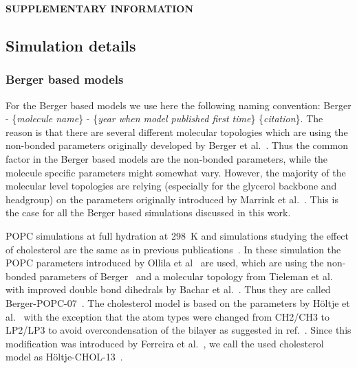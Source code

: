 \documentclass[journal=jacsat,manuscript=article]{achemso}
\begin{document}


\newpage
\begin{center}
{\bf SUPPLEMENTARY INFORMATION}
\end{center}
\subsection{Simulation details} 
\subsubsection{Berger based models}
For the Berger based models we use here the following naming convention: 
Berger - \{{\it molecule name}\} - \{{\it year when model published first time}\} \{{\it citation}\}.
The reason is that there are several different molecular topologies which are using the non-bonded parameters originally
developed by Berger et al.~\cite{berger97}. Thus the common factor in the Berger based models are the non-bonded parameters,
while the molecule specific parameters might somewhat vary. However, the majority of the molecular level topologies are 
relying (especially for the glycerol backbone and headgroup) on the parameters originally introduced by Marrink et al.~\cite{marrink98}.
This is the case for all the Berger based simulations discussed in this work.

POPC simulations at full hydration at 298~K and simulations studying the effect of cholesterol are the same as in previous publications~\cite{ferreira13,ferreira15}.
In these simulation the POPC parameters introduced by Ollila et al~\cite{ollila07a} are used, which are using the non-bonded parameters of Berger~\cite{berger97}
and a molecular topology from Tieleman et al.~\cite{tieleman99} with improved double bond dihedrals by Bachar et al.~\cite{bachar04}. 
Thus they are called Berger-POPC-07~\cite{ollila07a}. The cholesterol model is based on the parameters by H\"oltje et al.~\cite{holtje01} with the
exception that the atom types were changed from CH2/CH3 to LP2/LP3 to avoid overcondensation of the bilayer as suggested in ref.~\cite{tieleman06}.
Since this modification was introduced by Ferreira et al.~\cite{ferreira13}, we call the used cholesterol model as H\"oltje-CHOL-13~\cite{ferreira13}.
\end{document}
